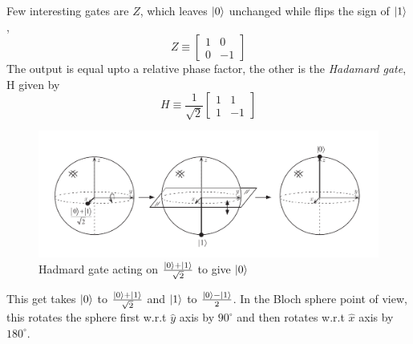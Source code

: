 Few interesting gates are $Z$, which leaves $\ket{0}$ unchanged while flips the sign of $\ket{1}$,
\begin{equation}
    Z \equiv \begin{bmatrix}
        1 & 0 \\ 0 & -1
    \end{bmatrix}
\end{equation}
The output is equal upto a relative phase factor, the other is the \textit{Hadamard gate}, H given by
\begin{equation}
    H \equiv \frac{1}{\sqrt{2}}\begin{bmatrix}
        1 & 1 \\ 1 & -1
    \end{bmatrix}
\end{equation}
\begin{figure}[H]
    \centering
    \includegraphics[width=\textwidth]{images/hadmard_bloch.png}
    \caption{Hadmard gate acting on $\frac{\ket{0} + \ket{1}}{\sqrt{2}}$ to give $\ket{0}$}
    \label{fig:hadmard_bloch}
\end{figure}
This get takes $\ket{0}$ to $\frac{\ket{0} + \ket{1}}{\sqrt{2}}$ and $\ket{1}$ to $\frac{\ket{0}-\ket{1}}{2}$. In the Bloch sphere point of view, this rotates the sphere first w.r.t $\hat{y}$ axis by $90^\circ$ and then rotates w.r.t $\hat{x}$ axis by $180^\circ$.

